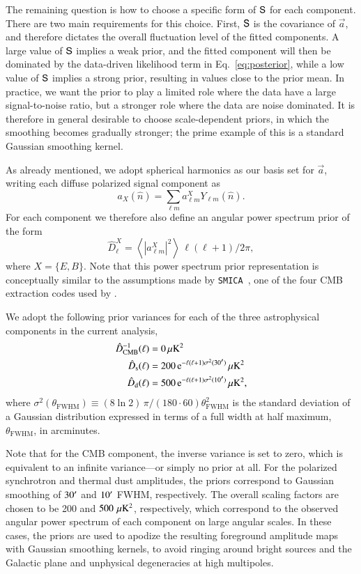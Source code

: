 \documentclass[twocolumn]{aa}
\def\smica{\texttt{SMICA}}
\renewcommand{\a}[0]{\vec{a}}
\renewcommand{\S}[0]{\tens{S}}
\newcommand{\?}[1]{\textcolor{red}{{\bf [#1]}}}
\begin{document}
The remaining question is how to choose a specific form of $\S$ for each
component. There are two main requirements for this choice. First, $\S$ is the
covariance of $\a$, and therefore dictates the overall fluctuation level of the
fitted components. A large value of $\S$ implies a weak prior, and the fitted
component will then be dominated by the data-driven likelihood term in
Eq.~\eqref{eq:posterior}, while a low value of $\S$ implies a strong prior,
resulting in values close to the prior mean. In practice, we want the prior to
play a limited role where the data have a large signal-to-noise ratio, but a
stronger role where the data are noise dominated. It is therefore in general
desirable to choose scale-dependent priors, in which the smoothing becomes
gradually stronger; the prime example of this is a standard Gaussian smoothing
kernel.

As already mentioned, we adopt spherical harmonics as our basis set
for $\a$, writing each diffuse polarized signal component as
\begin{equation}
a_{X}(\hat{n}) = \sum_{\ell m} a^{X}_{\ell m} Y_{\ell m}(\hat{n}).
\end{equation}
For each component we therefore also define an angular power spectrum prior of the form
\begin{equation}
  \hat{D}^{X}_{\ell} = \left<|a^{X}_{\ell m}|^2\right> \,\ell(\ell+1)/2\pi,
\end{equation} 
where $X=\{E,B\}$. Note that this power spectrum
prior representation is conceptually similar to the assumptions made by \smica\
\citep{cardoso2008}, one of the four CMB extraction codes used by \Planck.

We adopt the following prior variances for each of the three
astrophysical components in the current analysis,
\begin{align}
  \hat{D}^{-1}_{\mathrm{CMB}}(\ell) &= 0\,\mu\mathrm{K}^2\\
  \hat{D}_{\mathrm{s}}(\ell) &= 200\, \mathrm e^{-\ell(\ell+1)\sigma^2(30\arcm)}
  \,\mu\mathrm{K}^2\\
  \hat{D}_{\mathrm{d}}(\ell) &= 500\, \mathrm e^{-\ell(\ell+1)\sigma^2(10\arcm)}
  \,\mu\mathrm{K}^2,
\end{align}
where $\sigma^2(\theta_{\mathrm{FWHM}})\equiv (8\ln 2)\,
\pi/(180\cdot60)\theta_{\mathrm{FWHM}}^2$ is the standard deviation of a
Gaussian distribution expressed in terms of a full width at half maximum,
$\theta_{\mathrm{FWHM}}$, in arcminutes.

Note that for the CMB component, the inverse variance is set to zero,
which is equivalent to an infinite variance---or simply no prior at
all. For the polarized synchrotron and thermal dust amplitudes, the
priors correspond to Gaussian smoothing of $30\arcm$ and $10\arcm$
FWHM, respectively. The overall scaling factors are chosen to be 200
and $500\,\muK^2$, respectively, which correspond to the observed
angular power spectrum of each component on large angular scales. In
these cases, the priors are used to apodize the resulting foreground
amplitude maps with Gaussian smoothing kernels, to avoid ringing
around bright sources and the Galactic plane and unphysical
degeneracies at high multipoles.
\end{document}
